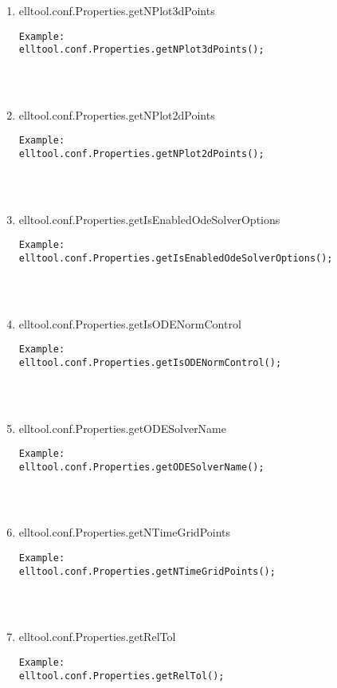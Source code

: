 \begin{enumerate}
\begin{lstlisting}
\end{lstlisting}
\fontfamily{\familydefault}
\selectfont
\item {elltool.conf.Properties.getNPlot3dPoints}
\selectfont
\begin{lstlisting}
Example:
elltool.conf.Properties.getNPlot3dPoints();




\end{lstlisting}
\fontfamily{\familydefault}
\selectfont
\item {elltool.conf.Properties.getNPlot2dPoints}
\selectfont
\begin{lstlisting}
Example:
elltool.conf.Properties.getNPlot2dPoints();




\end{lstlisting}
\fontfamily{\familydefault}
\selectfont
\item {elltool.conf.Properties.getIsEnabledOdeSolverOptions}
\selectfont
\begin{lstlisting}
Example:
elltool.conf.Properties.getIsEnabledOdeSolverOptions();




\end{lstlisting}
\fontfamily{\familydefault}
\selectfont
\item {elltool.conf.Properties.getIsODENormControl}
\selectfont
\begin{lstlisting}
Example:
elltool.conf.Properties.getIsODENormControl();




\end{lstlisting}
\fontfamily{\familydefault}
\selectfont
\item {elltool.conf.Properties.getODESolverName}
\selectfont
\begin{lstlisting}
Example:
elltool.conf.Properties.getODESolverName();




\end{lstlisting}
\fontfamily{\familydefault}
\selectfont
\item {elltool.conf.Properties.getNTimeGridPoints}
\selectfont
\begin{lstlisting}
Example:
elltool.conf.Properties.getNTimeGridPoints();




\end{lstlisting}
\fontfamily{\familydefault}
\selectfont
\item {elltool.conf.Properties.getRelTol}
\selectfont
\begin{lstlisting}
Example:
elltool.conf.Properties.getRelTol();





\end{lstlisting}
\end{enumerate}
